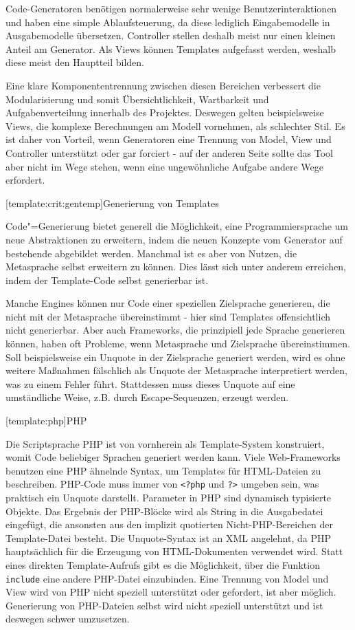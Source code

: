 \documentclass[11pt, a4paper, bibgerm]{book}
\newcommand\icode[1]{\lstinline?#1?}
\newcommand\phpo{\lstinline+<?php+}
\newcommand\phpc{\lstinline+?>+}
\newcommand\lsection{}
\newcommand\lsubsection{}
\newcommand{\cgen}{Code"=Generierung}
\begin{document}
Code-Generatoren benötigen normalerweise sehr wenige
Benutzerinteraktionen und haben eine simple Ablaufsteuerung, da diese
lediglich Eingabemodelle in Ausgabemodelle übersetzen. Controller
stellen deshalb meist nur einen kleinen Anteil am Generator. Als Views
können Templates aufgefasst werden, weshalb diese meist den Hauptteil
bilden.

Eine klare Komponententrennung zwischen diesen Bereichen verbessert die
Modularisierung und somit Übersichtlichkeit, Wartbarkeit und
Aufgabenverteilung innerhalb des Projektes. Deswegen gelten
beispielsweise Views, die komplexe Berechnungen am Modell vornehmen, als
schlechter Stil. Es ist daher von Vorteil, wenn Generatoren eine
Trennung von Model, View und Controller unterstützt oder gar forciert -
auf der anderen Seite sollte das Tool aber nicht im Wege stehen, wenn
eine ungewöhnliche Aufgabe andere Wege erfordert.

\lsubsection[template:crit:gentemp]{Generierung von Templates}

\cgen{} bietet generell die Möglichkeit, eine Programmiersprache um neue
Abstraktionen zu erweitern, indem die neuen Konzepte vom Generator auf
bestehende abgebildet werden. Manchmal ist es aber von Nutzen, die
Metasprache selbst erweitern zu können. Dies lässt sich unter anderem
erreichen, indem der Template-Code selbst generierbar ist.

Manche Engines können nur Code einer speziellen Zielsprache generieren,
die nicht mit der Metasprache übereinstimmt - hier sind Templates
offensichtlich nicht generierbar. Aber auch Frameworks, die prinzipiell
jede Sprache generieren können, haben oft Probleme, wenn Metasprache und
Zielsprache übereinstimmen. Soll beispielsweise ein Unquote in der
Zielsprache generiert werden, wird es ohne weitere Maßnahmen fälschlich
als Unquote der Metasprache interpretiert werden, was zu einem Fehler
führt. Stattdessen muss dieses Unquote auf eine umständliche Weise,
z.B. durch Escape-Sequenzen, erzeugt werden.

\lsection[template:php]{PHP}

Die Scriptsprache PHP ist von vornherein als Template-System
konstruiert, womit Code beliebiger Sprachen generiert werden kann. Viele
Web-Frameworks benutzen eine PHP ähnelnde Syntax, um Templates für
HTML-Dateien zu beschreiben. PHP-Code muss immer von \phpo{} und \phpc{}
umgeben sein, was praktisch ein Unquote darstellt. Parameter in PHP sind
dynamisch typisierte Objekte. Das Ergebnis der PHP-Blöcke wird als
String in die Ausgabedatei eingefügt, die ansonsten aus den implizit
quotierten Nicht-PHP-Bereichen der Template-Datei besteht. Die
Unquote-Syntax ist an XML angelehnt, da PHP hauptsächlich für die
Erzeugung von HTML-Dokumenten verwendet wird. Statt eines direkten
Template-Aufrufs gibt es die Möglichkeit, über die Funktion
\icode{include} eine andere PHP-Datei einzubinden. Eine Trennung von
Model und View wird von PHP nicht speziell unterstützt oder gefordert,
ist aber möglich. Generierung von PHP-Dateien selbst wird nicht speziell
unterstützt und ist deswegen schwer umzusetzen.
\end{document}
